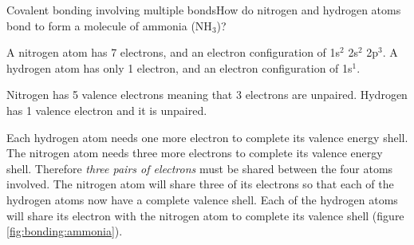 \begin{wex}{Covalent bonding involving multiple bonds}{How do nitrogen and hydrogen atoms bond to form a molecule of ammonia (NH$_{3}$)?\\}
{

A nitrogen atom has 7 electrons, and an electron configuration of 1s$^{2}$ 2s$^{2}$ 2p$^{3}$. A hydrogen atom has only 1 electron, and an electron configuration of 1s$^{1}$.


Nitrogen has 5 valence electrons meaning that 3 electrons are unpaired. Hydrogen has 1 valence electron and it is unpaired.


Each hydrogen atom needs one more electron to complete its valence energy shell. The nitrogen atom needs three more electrons to complete its valence energy shell. Therefore \textit{three pairs of electrons} must be shared between the four atoms involved. The nitrogen atom will share three of its electrons so that each of the hydrogen atoms now have a complete valence shell. Each of the hydrogen atoms will share its electron with the nitrogen atom to complete its valence shell (figure \ref{fig:bonding:ammonia}).

\begin{figure}[H]
\end{figure}}
\end{wex}
